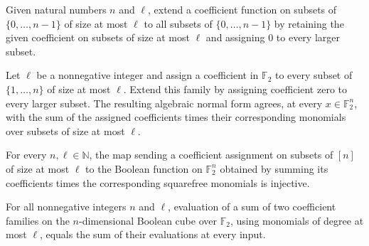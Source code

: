 \begin{definition}
\leanok
{}
Given natural numbers $n$ and $\ell$, extend a coefficient function on subsets of
$\{0,\ldots,n-1\}$ of size at most $\ell$ to all subsets of $\{0,\ldots,n-1\}$ by
retaining the given coefficient on subsets of size at most $\ell$ and assigning $0$ to
every larger subset.
\end{definition}

\begin{theorem}
\leanok
{}
Let $\ell$ be a nonnegative integer and assign a coefficient in $\mathbb{F}_2$ to every
subset of $\{1,\ldots,n\}$ of size at most $\ell$. Extend this family by assigning
coefficient zero to every larger subset. The resulting algebraic normal form agrees, at
every $x\in\mathbb{F}_2^n$, with the sum of the assigned coefficients times their
corresponding monomials over subsets of size at most $\ell$.
\end{theorem}

\begin{theorem}
\leanok
{}
For every $n,
\ell\in\mathbb{N}$, the map sending a coefficient assignment on subsets of $[n]$ of size
at most $\ell$ to the Boolean function on $\mathbb{F}_2^n$ obtained by summing its
coefficients times the corresponding squarefree monomials is injective.
\end{theorem}

\begin{theorem}
\leanok
{}
For all nonnegative integers $n$ and $\ell$, evaluation of a sum of two coefficient
families on the $n$-dimensional Boolean cube over $\mathbb{F}_2$, using monomials of
degree at most $\ell$, equals the sum of their evaluations at every input.
\end{theorem}

